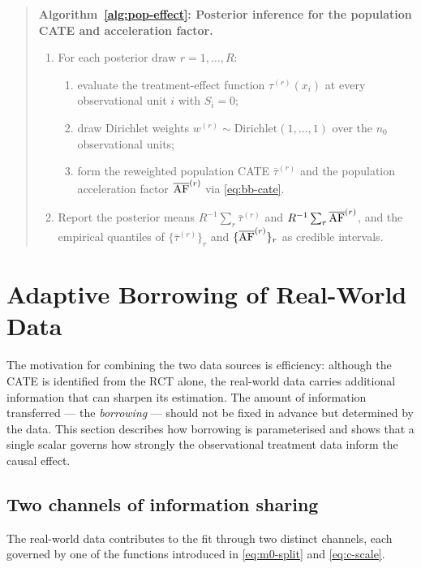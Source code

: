 \begin{quote}
\noindent\textbf{Algorithm~\ref{alg:pop-effect}: Posterior inference for the
population CATE and acceleration factor.}\label{alg:pop-effect}
\begin{enumerate}[label=\textup{(\arabic*)},leftmargin=2.4em]
\item For each posterior draw $r = 1, \dots, R$:
  \begin{enumerate}[label=\textup{(\alph*)},leftmargin=2.0em]
  \item evaluate the treatment-effect function $\tau^{(r)}(x_i)$ at every
        observational unit $i$ with $S_i = 0$;
  \item draw Dirichlet weights $w^{(r)} \sim \mathrm{Dirichlet}(1,\dots,1)$
        over the $n_0$ observational units;
  \item form the reweighted population CATE $\bar\tau^{(r)}$ and the population
        acceleration factor $\overline{\mathrm{AF}}^{(r)}$ via \eqref{eq:bb-cate}.
  \end{enumerate}
\item Report the posterior means $R^{-1}\sum_r \bar\tau^{(r)}$ and
      $R^{-1}\sum_r \overline{\mathrm{AF}}^{(r)}$, and the empirical quantiles of
      $\{\bar\tau^{(r)}\}_r$ and $\{\overline{\mathrm{AF}}^{(r)}\}_r$ as credible
      intervals.
\end{enumerate}
\end{quote}

\section{Adaptive Borrowing of Real-World Data}
\label{sec:pi-borrowing}

The motivation for combining the two data sources is efficiency: although the
CATE is identified from the RCT alone, the real-world data carries
additional information that can sharpen its estimation. The amount of
information transferred --- the \emph{borrowing} --- should not be fixed in
advance but determined by the data. This section describes how borrowing is
parameterised and shows that a single scalar governs how strongly the
observational treatment data inform the causal effect.

\subsection{Two channels of information sharing}

The real-world data contributes to the fit through two distinct channels,
each governed by one of the functions introduced in \eqref{eq:m0-split} and
\eqref{eq:c-scale}.

